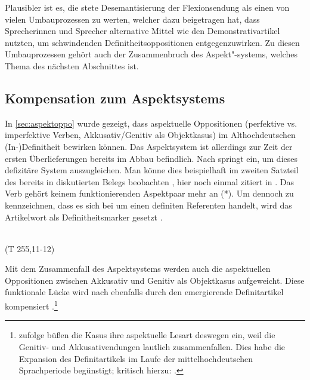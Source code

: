 Plausibler ist es, die stete Desemantisierung der Flexionsendung als einen von vielen Umbauprozessen zu werten, welcher dazu beigetragen hat, dass Sprecherinnen und Sprecher alternative Mittel wie den Demonstrativartikel nutzten, um schwindenden Definitheitsoppositionen entgegenzuwirken. Zu diesen Umbauprozessen gehört auch der Zusammenbruch des Aspekt"-systems, welches Thema des nächsten Abschnittes ist.

\subsection{Kompensation zum Aspektsystems} \label{aspekt}

In \ref{sec:aspektoppo} wurde gezeigt, dass aspektuelle Oppositionen (perfektive vs. imperfektive Verben, Akkusativ/Genitiv als Objektkasus) im Althochdeutschen (In-)Definitheit bewirken können. Das Aspektsystem ist allerdings zur Zeit der ersten Überlieferungen bereits im Abbau befindlich. Nach  \textcite{Leiss1994,Leiss2000,Leiss2010} springt  ein, um dieses defizitäre System auszugleichen. Man könne dies beispielhaft im zweiten Satzteil des bereits in  diskutierten Belegs beobachten \parencite[180f.]{Leiss2000}, hier noch einmal zitiert in . Das Verb  gehört keinem funktionierenden Aspektpaar mehr an (*). Um dennoch zu kennzeichnen, dass es sich bei  um einen definiten Referenten handelt, wird das Artikelwort  als Definitheitsmarker gesetzt \parencite[181]{Leiss2000}.


\begin{exe}
	\ex \label{ex:bilan}   \\   (T 255,11-12)
\end{exe}
\noindent
Mit dem Zusammenfall des Aspektsystems werden auch die aspektuellen Oppositionen zwischen Akkusativ und Genitiv als Objektkasus aufgeweicht. Diese funktionale Lücke wird nach \textcite[187ff.]{Leiss2000} ebenfalls durch den emergierende Definitartikel kompensiert \parencite[vgl. auch][46f.]{Abraham1997}.\footnote{\textcite[88f.]{Philippi1997} zufolge büßen die Kasus ihre aspektuelle Lesart deswegen ein, weil die Genitiv- und Akkusativendungen lautlich zusammenfallen. Dies habe die Expansion des Definitartikels im Laufe der mittelhochdeutschen Sprachperiode begünstigt; kritisch hierzu: \textcite[234f.]{Lyons1999}.}

